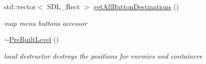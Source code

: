 \begin{DoxyCompactItemize}
\hypertarget{class_pre_built_level_ac03a041e9981a044dceb7aa0b2fa5639}{}\label{class_pre_built_level_ac03a041e9981a044dceb7aa0b2fa5639} 
std\+::vector$<$ S\+D\+L\+\_\+\+Rect $>$ \hyperlink{class_pre_built_level_ac03a041e9981a044dceb7aa0b2fa5639}{get\+All\+Button\+Destinations} ()
\begin{DoxyCompactList}\small\item\em map menu buttons accessor \end{DoxyCompactList}\item 
\hypertarget{class_pre_built_level_a06411fd72dc81d3792c3e6e6fe0fc416}{}\label{class_pre_built_level_a06411fd72dc81d3792c3e6e6fe0fc416} 
\hyperlink{class_pre_built_level_a06411fd72dc81d3792c3e6e6fe0fc416}{$\sim$\+Pre\+Built\+Level} ()
\begin{DoxyCompactList}\small\item\em local destructor destroys the positions for enemies and containers \end{DoxyCompactList}\end{DoxyCompactItemize}
